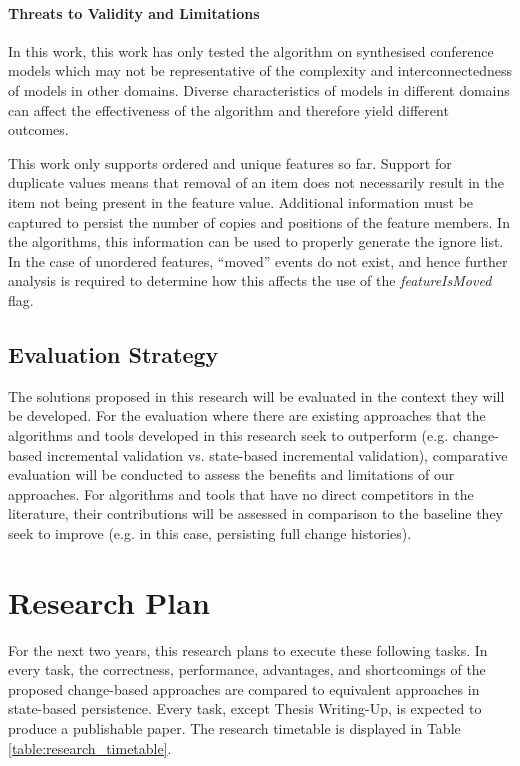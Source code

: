 \documentclass[12pt, a4paper]{report} \usepackage[titletoc]{appendix}
\begin{document}
\subsubsection{Threats to Validity and Limitations}
\label{sec:limitations_and_future_work}
In this work, this work has only tested the algorithm on synthesised conference models which may not be representative of the complexity and interconnectedness of models in other domains. Diverse characteristics of models in different domains can affect the effectiveness of the algorithm and therefore yield different outcomes. 

This work only supports ordered and unique features so far. Support for duplicate values means that removal of an item does not necessarily result in the item not being present in the feature value. Additional information must be captured to persist the number of copies and positions of the feature members. In the algorithms, this information can be used to properly generate the ignore list. In the case of unordered features, ``moved'' events do not exist, and hence further analysis is required to determine how this affects the use of the \emph{featureIsMoved} flag. 

\section{Evaluation Strategy}
\label{sec:evaluation_strategy}
The solutions proposed in this research will be evaluated in the context they will be developed. For the evaluation where there are existing approaches that the algorithms and tools developed in this research seek to outperform (e.g. change-based incremental validation vs. state-based incremental validation), comparative evaluation will be conducted to assess the benefits and limitations of our approaches. For algorithms and tools that have no direct competitors in the literature, their contributions will be assessed in comparison to the baseline they seek to improve (e.g. in this case, persisting full change histories).

\chapter{Research Plan}
\label{ch:research_plan}
For the next two years, this research plans to execute these following tasks. In every task, the correctness, performance, advantages, and shortcomings of the proposed change-based approaches are compared to equivalent approaches in state-based persistence. Every task, except Thesis Writing-Up, is expected to produce a publishable paper. The research timetable is displayed in Table \ref{table:research_timetable}.
\end{document}
